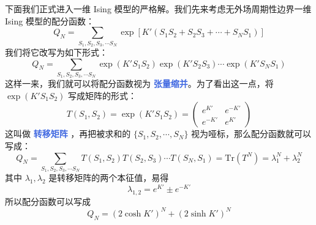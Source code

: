 下面我们正式进入一维 Ising 模型的严格解。我们先来考虑无外场周期性边界一维 Ising 模型的配分函数：
\begin{equation}\label{equ:一维Ising模型的配分函数}
    Q_N = \sum_{S_1,S_2,S_3,\cdots S_N} \exp\left[K' (S_1 S_{2}+S_2S_3+\cdots+S_NS_1)\right]
\end{equation}
我们将它改写为如下形式：
\begin{equation}
    Q_N = \sum_{S_1,S_2,S_3,\cdots S_N} \exp(K' S_1 S_{2}) \exp(K' S_2 S_{3}) \cdots \exp(K' S_N S_{1})
\end{equation}
这样一来，我们就可以将配分函数视为 \textcolor{RoyalBlue}{\textbf{\kaishu 张量缩并}}。为了看出这一点，将 $\exp(K' S_1 S_2)$ 写成矩阵的形式：
\begin{equation}
    T(S_1,S_2) = \exp(K' S_1 S_{2}) = \begin{pmatrix}
        e^{K'} & e^{-K'} \\
        e^{-K'} & e^{K'}
    \end{pmatrix}
\end{equation}
这叫做 \textcolor{RoyalBlue}{\textbf{\kaishu 转移矩阵}} ，再把被求和的 $\{S_1,S_2,\cdots,S_N\}$ 视为哑标，那么配分函数就可以写成：
\begin{equation}
    Q_N = \sum_{S_1,S_2,S_3,\cdots S_N} T(S_1,S_2) T(S_2,S_3) \cdots T(S_N,S_1) = \text{Tr}(T^N) = \lambda _1^N + \lambda_2^N
\end{equation}
其中 $\lambda_1,\lambda_2$ 是转移矩阵的两个本征值，易得
\begin{equation}
    \lambda_{1,2} = e^{K'} \pm e^{-K'}
\end{equation}
所以配分函数可以写成
\begin{equation}
    Q_N = (2\cosh K')^N + (2\sinh K')^N
\end{equation}

